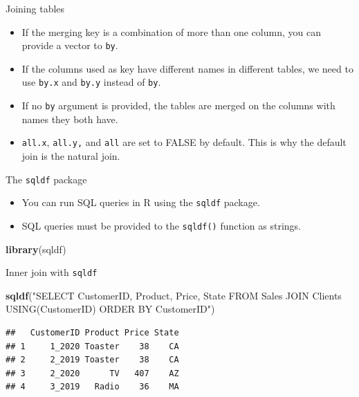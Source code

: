 \documentclass[ignorenonframetext,]{beamer}
\newenvironment{Shaded}{\begin{snugshade}}{\end{snugshade}}
\newcommand{\KeywordTok}[1]{\textcolor[rgb]{0.13,0.29,0.53}{\textbf{#1}}}
\newcommand{\NormalTok}[1]{#1}
\newcommand{\StringTok}[1]{\textcolor[rgb]{0.31,0.60,0.02}{#1}}
\begin{document}
\begin{frame}[fragile]{Joining tables}
\protect\hypertarget{joining-tables-2}{}

\begin{itemize}
\item
  If the merging key is a combination of more than one column, you can
  provide a vector to \texttt{by}.
\item
  If the columns used as key have different names in different tables,
  we need to use \texttt{by.x} and \texttt{by.y} instead of \texttt{by}.
\item
  If no \texttt{by} argument is provided, the tables are merged on the
  columns with names they both have.
\item
  \texttt{all.x}, \texttt{all.y,} and \texttt{all} are set to FALSE by
  default. This is why the default join is the natural join.
\end{itemize}

\end{frame}

\begin{frame}[fragile]{The \texttt{sqldf} package}
\protect\hypertarget{the-sqldf-package}{}

\begin{itemize}
\item
  You can run SQL queries in R using the \texttt{sqldf} package.
\item
  SQL queries must be provided to the \texttt{sqldf()} function as
  strings.
\end{itemize}

\begin{Shaded}
\begin{Highlighting}[]
\KeywordTok{library}\NormalTok{(sqldf)}
\end{Highlighting}
\end{Shaded}

\end{frame}

\begin{frame}[fragile]{Inner join with \texttt{sqldf}}
\protect\hypertarget{inner-join-with-sqldf}{}

\begin{Shaded}
\begin{Highlighting}[]
\KeywordTok{sqldf}\NormalTok{(}\StringTok{"SELECT CustomerID, Product, Price, State }
\StringTok{       FROM Sales}
\StringTok{       JOIN Clients }
\StringTok{       USING(CustomerID)}
\StringTok{       ORDER BY CustomerID"}\NormalTok{)}
\end{Highlighting}
\end{Shaded}

\begin{verbatim}
##   CustomerID Product Price State
## 1     1_2020 Toaster    38    CA
## 2     2_2019 Toaster    38    CA
## 3     2_2020      TV   407    AZ
## 4     3_2019   Radio    36    MA
\end{verbatim}

\end{frame}
\end{document}
